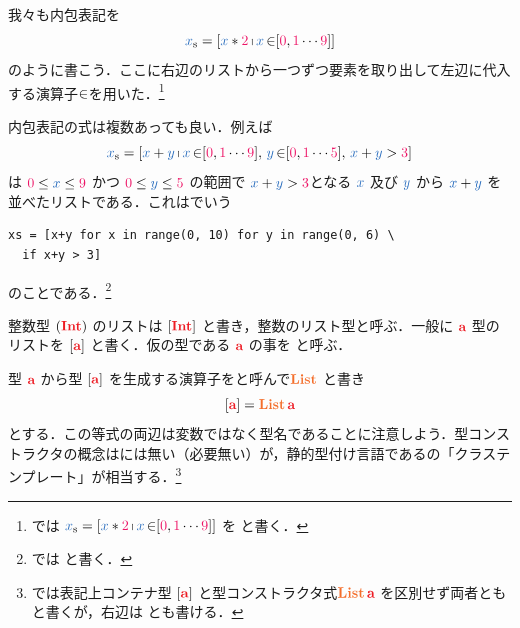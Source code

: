 \documentclass[a5paper,twoside,fleqn,draft]{jsbook}
\begin{document}
我々も内包表記を
\begin{equation}
  \hListVar{x}
  =\hListWith{\hVar{x}*\hConstant{2}\hListComprehension\hVar{x}\hFrom\hListWith{\hConstant{0},\hConstant{1}\dotsb\hConstant{9}}}
\end{equation}
のように書こう．ここに右辺のリストから一つずつ要素を取り出して左辺に代入する演算子$\operatorname{\in}$を用いた．\footnote{\haskell では $  \hListVar{x}=\hListWith{\hVar{x}*\hConstant{2}\hListComprehension\hVar{x}\hFrom\hListWith{\hConstant{0},\hConstant{1}\dotsb\hConstant{9}}}
$ を  と書く．}

内包表記の式は複数あっても良い．例えば
\begin{equation}
  \hListVar{x}
  =[\hVar{x}+\hVar{y}\mListComp\hVar{x}\mFrom[\hConstant{0},\hConstant{1}\dotsb\hConstant{9}],\,\hVar{y}\mFrom[\hConstant{0},\hConstant{1}\dotsb\hConstant{5}],\,\hVar{x}+\hVar{y}>\hConstant{3}]
\end{equation}
は $\hConstant{0}\le\hVar{x}\le\hConstant{9}$ かつ $\hConstant{0}\le\hVar{y}\le\hConstant{5}$ の範囲で $\hVar{x}+\hVar{y}>\hConstant{3}$となる $\hVar{x}$ 及び $\hVar{y}$ から $\hVar{x}+\hVar{y}$ を並べたリストである．これは\python でいう
\begin{pythoncode}
\begin{verbatim}
xs = [x+y for x in range(0, 10) for y in range(0, 6) \
  if x+y > 3]
\end{verbatim}
\end{pythoncode}
のことである．\footnote{\haskell では  と書く．}


整数型 $(\hInt)$ のリストは $\hListConstruct{\hInt}$ と書き，整数のリスト型と呼ぶ．一般に $\hTypeName{a}$ 型のリストを $\hListConstruct{\hTypeName{a}}$ と書く．仮の型である $\hTypeName{a}$ の事を と呼ぶ．

型 $\hTypeName{a}$ から型 $\hListConstruct{\hTypeName{a}}$ を生成する演算子をと呼んで$\hList$ と書き
\begin{equation}
  \hListConstruct{\hTypeName{a}}
  =\hList\,\hTypeName{a}
\end{equation}
とする．この等式の両辺は変数ではなく型名であることに注意しよう．型コンストラクタの概念は\python には無い（必要無い）が，静的型付け言語である\cxx の「クラステンプレート」が相当する．\footnote{\haskell では表記上コンテナ型 $\hListConstruct{\hTypeName{a}}$ と型コンストラクタ式$\hList\,\hTypeName{a}$ を区別せず両者とも \code{[a]} と書くが，右辺は  とも書ける．}
\end{document}
